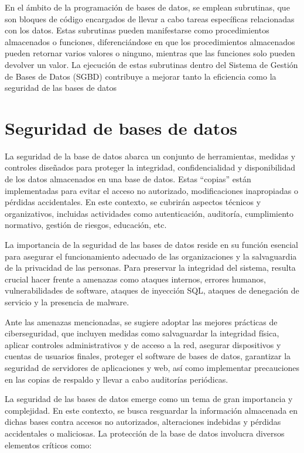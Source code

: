 \documentclass[11pt]{report}
\begin{document}
En el ámbito de la programación de bases de datos, se emplean subrutinas, que son
bloques de código encargados de llevar a cabo tareas específicas relacionadas con los
datos. Estas subrutinas pueden manifestarse como procedimientos almacenados o
funciones, diferenciándose en que los procedimientos almacenados pueden retornar varios
valores o ninguno, mientras que las funciones solo pueden devolver un valor. La ejecución
de estas subrutinas dentro del Sistema de Gestión de Bases de Datos (SGBD) contribuye a
mejorar tanto la eficiencia como la seguridad de las bases de datos

\section{Seguridad de bases de datos}
La seguridad de la base de datos abarca un conjunto de herramientas, medidas y controles
diseñados para proteger la integridad, confidencialidad y disponibilidad de los datos
almacenados en una base de datos. Estas “copias” están implementadas para evitar el
acceso no autorizado, modificaciones inapropiadas o pérdidas accidentales. En este
contexto, se cubrirán aspectos técnicos y organizativos, incluidas actividades como
autenticación, auditoría, cumplimiento normativo, gestión de riesgos, educación, etc.

La importancia de la seguridad de las bases de datos reside en su función esencial para
asegurar el funcionamiento adecuado de las organizaciones y la salvaguardia de la
privacidad de las personas. Para preservar la integridad del sistema, resulta crucial hacer
frente a amenazas como ataques internos, errores humanos, vulnerabilidades de software,
ataques de inyección SQL, ataques de denegación de servicio y la presencia de malware.

Ante las amenazas mencionadas, se sugiere adoptar las mejores prácticas de
ciberseguridad, que incluyen medidas como salvaguardar la integridad física, aplicar
controles administrativos y de acceso a la red, asegurar dispositivos y cuentas de usuarios
finales, proteger el software de bases de datos, garantizar la seguridad de servidores de
aplicaciones y web, así como implementar precauciones en las copias de respaldo y llevar a
cabo auditorías periódicas.

La seguridad de las bases de datos emerge como un tema de gran importancia y
complejidad. En este contexto, se busca resguardar la información almacenada en dichas
bases contra accesos no autorizados, alteraciones indebidas y pérdidas accidentales o
maliciosas. La protección de la base de datos involucra diversos elementos críticos como:
\end{document}
